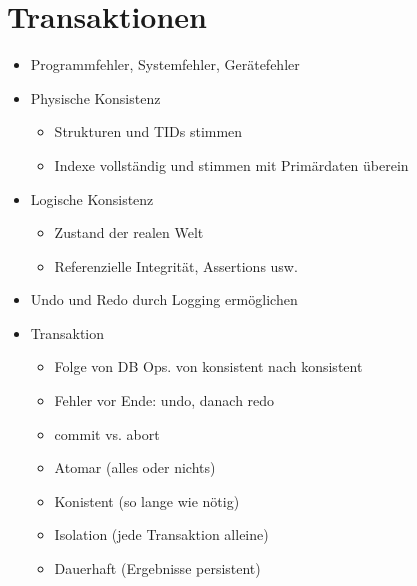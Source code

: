 \documentclass[11pt, paper=a4, twocolumn]{scrartcl}
\begin{document}
	\section{Transaktionen}
		\begin{itemize}
			\item Programmfehler, Systemfehler, Gerätefehler
			\item Physische Konsistenz
				\begin{itemize}
					\item Strukturen und TIDs stimmen
					\item Indexe vollständig und stimmen mit 
						Primärdaten überein
				\end{itemize}
			\item Logische Konsistenz
				\begin{itemize}
					\item Zustand der realen Welt
					\item Referenzielle Integrität, Assertions usw.
				\end{itemize}
			\item Undo und Redo durch Logging ermöglichen
			\item Transaktion
				\begin{itemize}
					\item Folge von DB Ops. von konsistent nach 
						konsistent
					\item Fehler vor Ende: undo, danach redo
					\item commit vs. abort
					\item Atomar (alles oder nichts)
					\item Konistent (so lange wie nötig)
					\item Isolation (jede Transaktion alleine)
					\item Dauerhaft (Ergebnisse persistent)
				\end{itemize}
		\end{itemize}
	
\end{document}
